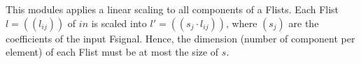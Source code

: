 This modules applies a linear scaling to all components of a Flists.
Each Flist $l=((l_{ij}))$ of $in$ is scaled into
$l'=((s_j\cdot l_{ij}))$, where $(s_j)$ are the coefficients
of the input Fsignal. Hence, the dimension (number of component
per element) of each Flist must be at most the size of $s$.
